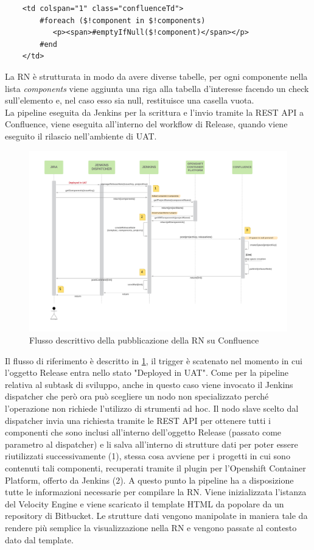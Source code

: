 \documentclass[a4paper, 12pt]{report}
\numberwithin{equation}{section}
\begin{document}
\begin{verbatim}
    <td colspan="1" class="confluenceTd">
        #foreach ($!component in $!components)
           <p><span>#emptyIfNull($!component)</span></p>
        #end
    </td>
\end{verbatim}
La RN è strutturata in modo da avere diverse tabelle, per ogni componente nella lista \emph{components} viene aggiunta una riga alla tabella d'interesse facendo un check sull'elemento e, nel caso esso sia null, restituisce una casella vuota.\\
La pipeline eseguita da Jenkins per la scrittura e l'invio tramite la REST API a Confluence, viene eseguita all'interno del workflow di Release, quando viene eseguito il rilascio nell'ambiente di UAT. \\
\begin{figure}
    \centering
    \includegraphics[width=\textwidth]{imgs/ReleaseNoteFlow.png}
    \caption{Flusso descrittivo della pubblicazione della RN su Confluence}
    \label{fig:relNote}
\end{figure}
Il flusso di riferimento è descritto in \ref{fig:relNote}, il trigger è scatenato nel momento in cui l'oggetto Release entra nello stato "Deployed in UAT". Come per la pipeline relativa al subtask di sviluppo, anche in questo caso viene invocato il Jenkins dispatcher che però ora può scegliere un nodo non specializzato perché l'operazione non richiede l'utilizzo di strumenti ad hoc. Il nodo slave scelto dal dispatcher invia una richiesta tramite le REST API per ottenere tutti i componenti che sono inclusi all'interno dell'oggetto Release (passato come parametro al dispatcher) e li salva all'interno di strutture dati per poter essere riutilizzati successivamente (1), stessa cosa avviene per i progetti in cui sono contenuti tali componenti, recuperati tramite il plugin per l'Openshift Container Platform, offerto da Jenkins (2). A questo punto la pipeline ha a disposizione tutte le informazioni necessarie per compilare la RN. Viene inizializzata l'istanza del Velocity Engine e viene scaricato il template HTML da popolare da un repository di Bitbucket. Le strutture dati vengono manipolate in maniera tale da rendere più semplice la visualizzazione nella RN e vengono passate al contesto dato dal template. \\
\end{document}
